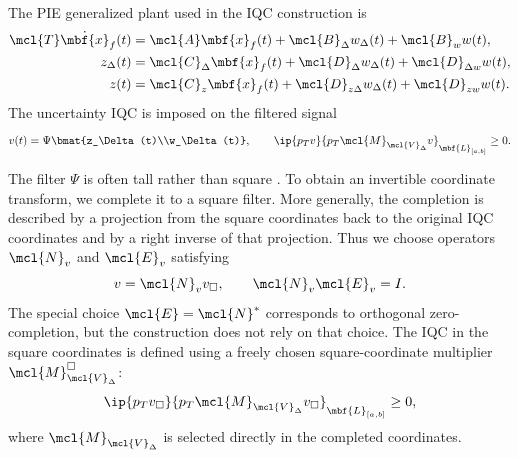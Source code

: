 The PIE generalized plant used in the IQC construction is
\begin{equation}\label{eqn:pie_gp}
    \begin{aligned}
        \mcl{T}\dot{\mbf{x}}_f(t)
        &=
        \mcl{A}\mbf{x}_f(t)
        +\mcl{B}_\Delta w_\Delta(t)
        +\mcl{B}_w w(t),\\
        z_\Delta(t)
        &=
        \mcl{C}_\Delta\mbf{x}_f(t)
        +\mcl{D}_\Delta w_\Delta(t)
        +\mcl{D}_{\Delta w}w(t),\\
        z(t)
        &=
        \mcl{C}_z\mbf{x}_f(t)
        +\mcl{D}_{z\Delta}w_\Delta(t)
        +\mcl{D}_{zw}w(t).
    \end{aligned}
\end{equation}
The uncertainty IQC is imposed on the filtered signal
\begin{equation}\label{eqn:pie_unc_iqc}
    v(t)
    =
    \Psi\bmat{z_\Delta(t)\\w_\Delta(t)},
    \qquad
    \ip{p_T v}{p_T\mcl{M}_{\mcl{V}_\Delta}v}_{\mbf{L}_{[a,b]}}
    \geq 0.
\end{equation}

The filter $\Psi$ is often tall rather than square
\cite{koserobust,veenman2016robust}. To obtain an invertible coordinate
transform, we complete it to a square filter. More generally, the completion is described by a projection from the square
coordinates back to the original IQC coordinates and by a right inverse of that
projection. Thus we choose operators $\mcl{N}_v$ and $\mcl{E}_v$ satisfying
\begin{equation}\label{eqn:pie_selector}
    v=\mcl{N}_v v_\square,
    \qquad
    \mcl{N}_v\mcl{E}_v=I.
\end{equation}
The special choice $\mcl{E}=\mcl{N}^*$ corresponds to orthogonal
zero-completion, but the construction does not rely on that choice. The IQC in
the square coordinates is defined using a freely chosen square-coordinate
multiplier $\mcl{M}_{\mcl{V}_\Delta}^{\square}$:
\begin{equation}
    \ip{p_T v_\square}
    {p_T\mcl{M}_{\mcl{V}_\Delta}v_\square}_{\mbf{L}_{[a,b]}}
    \geq 0,
\end{equation}
where $\mcl{M}_{\mcl{V}_\Delta}$ is selected directly in the
completed coordinates.

